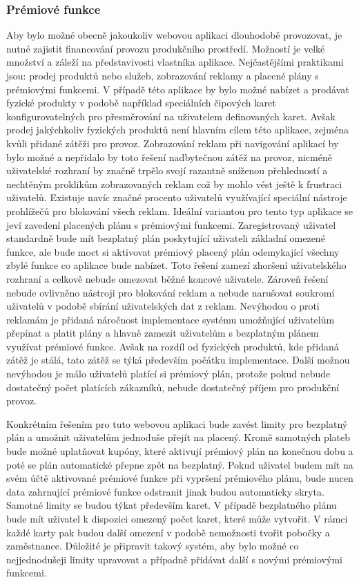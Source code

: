 \begin{itemize}
\begin{itemize}
		\subsubsection{Prémiové funkce}

		Aby bylo možné obecně jakoukoliv webovou aplikaci dlouhodobě provozovat, je nutné zajistit financování provozu
		produkčního prostředí.
		Možností je velké množství a záleží na představivosti vlastníka aplikace.
		Nejčastějšími praktikami jsou: prodej produktů nebo služeb, zobrazování reklamy a placené plány s prémiovými funkcemi.
		V případě této aplikace by bylo možné nabízet a prodávat fyzické produkty v podobě například speciálních čipových karet
		konfigurovatelných pro přesměrování na uživatelem definovaných karet.
		Avšak prodej jakýchkoliv fyzických produktů není hlavním cílem této aplikace, zejména kvůli přidané zátěži
		pro provoz.
		Zobrazování reklam při navigování aplikací by bylo možné a nepřidalo by toto řešení nadbytečnou zátěž na provoz,
		nicméně uživatelské rozhraní by značně trpělo svojí razantně sníženou přehledností a nechtěným proklikům zobrazovaných
		reklam což by mohlo vést ještě k frustraci uživatelů.
		Existuje navíc značné procento uživatelů využívající speciální nástroje prohlížečů pro blokování všech reklam.
		Ideální variantou pro tento typ aplikace se jeví zavedení placených plánu s prémiovými funkcemi.
		Zaregistrovaný uživatel standardně bude mít bezplatný plán poskytující uživateli základní omezené funkce, ale
		bude moct si aktivovat prémiový placený plán odemykající všechny zbylé funkce co aplikace bude nabízet.
		Toto řešení zamezí zhoršení uživatelského rozhraní a celkově nebude omezovat běžné koncové uživatele.
		Zároveň řešení nebude ovlivněno nástroji pro blokování reklam a nebude narušovat soukromí uživatelů v podobě
		sbírání uživatelských dat z reklam.
		Nevýhodou o proti reklamám je přidaná náročnost implementace systému umožňující uživatelům přepínat a platit
		plány a hlavně zamezit uživatelům s bezplatným plánem využívat prémiové funkce.
		Avšak na rozdíl od fyzických produktů, kde přidaná zátěž je stálá, tato zátěž se týká především počátku implementace.
		Další možnou nevýhodou je málo uživatelů platící si prémiový plán, protože pokud nebude dostatečný počet
		platících zákazníků, nebude dostatečný příjem pro produkční provoz.

		Konkrétním řešením pro tuto webovou aplikaci bude zavést limity pro bezplatný plán a umožnit uživatelům jednoduše
		přejít na placený.
		Kromě samotných plateb bude možné uplatňovat kupóny, které aktivují prémiový plán na konečnou dobu a poté se plán
		automatické přepne zpět na bezplatný.
		Pokud uživatel budem mít na svém účtě aktivované prémiové funkce při vypršení prémiového plánu, bude nucen
		data zahrnující prémiové funkce odstranit jinak budou automaticky skryta.
		Samotné limity se budou týkat především karet.
		V případě bezplatného plánu bude mít uživatel k dispozici omezený počet karet, které může vytvořit.
		V rámci každé karty pak budou další omezení v podobě nemožnosti tvořit pobočky a zaměstnance.
		Důležité je připravit takový systém, aby bylo možné co nejjednodušeji limity upravovat a případně přidávat další
		s novými prémiovými funkcemi.


\end{itemize}
\end{itemize}

